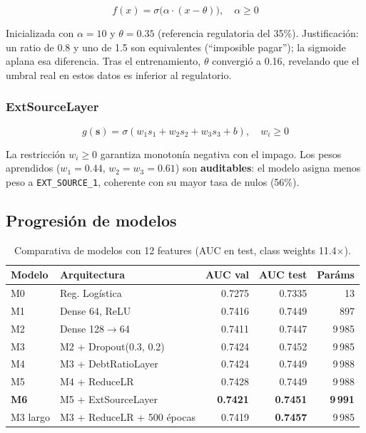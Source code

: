 \documentclass[12pt,a4paper]{article}
\begin{document}
\begin{equation}
    f(x) = \sigma\bigl(\alpha \cdot (x - \theta)\bigr), \quad \alpha \geq 0
    \label{eq:debt_layer}
\end{equation}

Inicializada con $\alpha=10$ y $\theta=0.35$ (referencia regulatoria del 35\%).
Justificación: un ratio de 0.8 y uno de 1.5 son equivalentes (``imposible pagar'');
la sigmoide aplana esa diferencia. Tras el entrenamiento, $\theta$ convergió
a 0.16, revelando que el umbral real en estos datos es inferior al regulatorio.

\subsubsection{ExtSourceLayer}

\begin{equation}
    g(\mathbf{s}) = \sigma(w_1 s_1 + w_2 s_2 + w_3 s_3 + b), \quad w_i \geq 0
    \label{eq:ext_layer}
\end{equation}

La restricción $w_i \geq 0$ garantiza monotonía negativa con el impago.
Los pesos aprendidos ($w_1=0.44$, $w_2=w_3=0.61$) son \textbf{auditables}:
el modelo asigna menos peso a \texttt{EXT\_SOURCE\_1}, coherente con su mayor
tasa de nulos (56\%).

\subsection{Progresión de modelos}

\begin{table}[H]
\centering
\caption{Comparativa de modelos con 12 features (AUC en test, class weights 11.4$\times$).}
\label{tab:models}
\begin{tabular}{@{}llrrr@{}}
\toprule
\textbf{Modelo} & \textbf{Arquitectura} & \textbf{AUC val} & \textbf{AUC test} & \textbf{Paráms} \\
\midrule
M0 & Reg. Logística               & 0.7275 & 0.7335 &     13 \\
M1 & Dense 64, ReLU               & 0.7416 & 0.7449 &    897 \\
M2 & Dense 128$\to$64             & 0.7411 & 0.7447 &  9\,985 \\
M3 & M2 + Dropout(0.3, 0.2)       & 0.7424 & 0.7452 &  9\,985 \\
M4 & M3 + DebtRatioLayer          & 0.7424 & 0.7449 &  9\,988 \\
M5 & M4 + ReduceLR                & 0.7428 & 0.7449 &  9\,988 \\
\textbf{M6} & M5 + ExtSourceLayer & \textbf{0.7421} & \textbf{0.7451} & \textbf{9\,991} \\
\midrule
M3 largo & M3 + ReduceLR + 500 épocas & 0.7419 & \textbf{0.7457} & 9\,985 \\
\bottomrule
\end{tabular}
\end{table}
\end{document}
